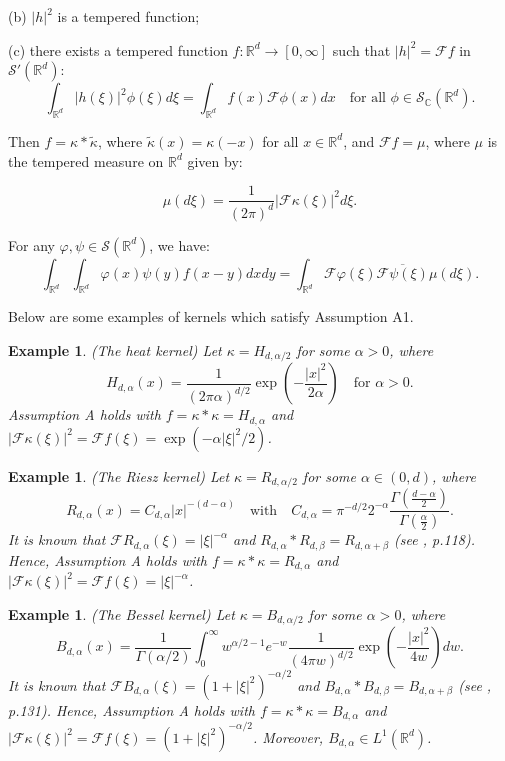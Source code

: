 \documentclass[12pt]{article}
\newtheorem{example}[theorem]{Example}
\def\cF{\mathcal{F}}
\def\cS{\mathcal{S}}
\def\bC{\mathbb{C}}
\def\bR{\mathbb{R}}
\def\k{\kappa}
\begin{document}
(b) $|h|^2$ is a tempered function;

(c) there exists a tempered function $f:\bR^d \to [0,\infty]$ such that $|h|^2=\cF f$ in $\cS'(\bR^d)$:
\begin{equation}
\label{Four-h2}
\int_{\bR^d} |h(\xi)|^2 \phi(\xi)d\xi=\int_{\bR^d}f(x) \cF \phi(x)dx \quad \mbox{for all $\phi \in \cS_{\bC}(\bR^d)$}.
\end{equation}




Then $f=\k*\widetilde{\k}$, where $\widetilde{\k}(x)=\k(-x)$ for all $x \in \bR^d$,
and $\cF f=\mu$, where $\mu$ is the tempered measure on $\bR^d$ given by:

\begin{equation}
\label{def-mu}
\mu(d\xi)=\frac{1}{(2\pi)^d}|\cF \k(\xi)|^2 d\xi.
\end{equation}

For any $\varphi,\psi \in \cS(\bR^d)$, we have:
\[
\int_{\bR^d} \int_{\bR^d}\varphi(x)\psi(y)f(x-y)dxdy=\int_{\bR^d}\cF \varphi(\xi) \overline{\cF \psi(\xi)}\mu(d\xi).
\]


Below are some examples of kernels which satisfy Assumption A1. 

\begin{example} (The heat kernel)
\label{heat-ex}
{\rm Let  $\k=H_{d,\alpha/2}$ for some $\alpha>0$, where
\[
H_{d,\alpha}(x)=\frac{1}{(2\pi \alpha)^{d/2}}\exp\left(-\frac{|x|^2}{2\alpha}\right) \quad \mbox{for $\alpha>0$}.
\]
Assumption A holds with $f=\k * \k=H_{d,\alpha}$ and $|\cF \k(\xi)|^2=\cF f(\xi)=\exp(-\alpha|\xi|^2/2)$.
}
\end{example}

\begin{example} (The Riesz kernel)
\label{Riesz-ex}
{\rm Let $\k=R_{d,\alpha/2}$ for some $\alpha\in (0,d)$, where
\[
R_{d,\alpha}(x)=C_{d,\alpha}|x|^{-(d-\alpha)} \quad \mbox{with} \quad C_{d,\alpha}=\pi^{-d/2}2^{-\alpha}\frac{\Gamma(\frac{d-\alpha}{2})}{\Gamma(\frac{\alpha}{2})}.
\]
It is known that $\cF R_{d,\alpha}(\xi)=|\xi|^{-\alpha}$ and $R_{d,\alpha}*R_{d,\beta}=R_{d,\alpha+\beta}$ (see \cite{stein70}, p.118). Hence, Assumption A holds with $f=\k * \k=R_{d,\alpha}$ and $|\cF \k (\xi)|^2=\cF f(\xi)=|\xi|^{-\alpha}$.
}
\end{example}

\begin{example} (The Bessel kernel)
\label{Bessel-ex}
{\rm Let $\k=B_{d,\alpha/2}$ for some $\alpha>0$, where
\[
B_{d,\alpha}(x)=\frac{1}{\Gamma(\alpha/2)}\int_0^{\infty} w^{\alpha/2-1}e^{-w} \frac{1}{(4\pi w)^{d/2}}\exp\left(-\frac{|x|^2}{4w}\right)dw.
\]
It is known that $\cF B_{d,\alpha}(\xi)=(1+|\xi|^{2})^{-\alpha/2}$ and $B_{d,\alpha}*B_{d,\beta}=B_{d,\alpha+\beta}$ (see \cite{stein70}, p.131).  Hence, Assumption A holds with $f=\k * \k=B_{d,\alpha}$ and $|\cF \k (\xi)|^2=\cF f(\xi)=(1+|\xi|^2)^{-\alpha/2}$. Moreover, $B_{d,\alpha}\in L^1(\bR^d)$.
}
\end{example}
\end{document}
